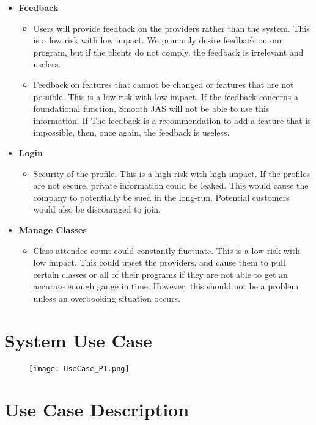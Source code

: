 \documentclass[12pt]{article}
\begin{document}
\begin{itemize}
\begin{itemize}
\end{itemize}
\item \textbf{Feedback}
\begin{itemize}
\item Users will provide feedback on the providers rather than the system. This is a low risk with low impact. We primarily desire feedback on our program, but if the clients do not comply, the feedback is irrelevant and useless.
\item Feedback on features that cannot be changed or features that are not possible. This is a low risk with low impact. If the feedback concerns a foundational function, Smooth JAS will not be able to use this information. If The feedback is a recommendation to add a feature that is impossible, then, once again, the feedback is useless. 
\end{itemize}
\item \textbf{Login}
\begin{itemize}
\item Security of the profile. This is a high risk with high impact. If the profiles are not secure, private information could be leaked. This would cause the company to potentially be sued in the long-run. Potential customers would also be discouraged to join. 
\end{itemize}
\item \textbf{Manage Classes}
\begin{itemize}
\item Class attendee count could constantly fluctuate. This is a low risk with low impact. This could upset the providers, and cause them to pull certain classes or all of their programs if they are not able to get an accurate enough gauge in time. However, this should not be a problem unless an overbooking situation occurs. 
\end{itemize}
\end{itemize}
\newpage
\section{System Use Case}
\begin{figure}[h]
\begin{center}
\texttt{[image: UseCase\_P1.png]}
\end{center}
\end{figure}

\newpage
\section{Use Case Description}
\end{document}
